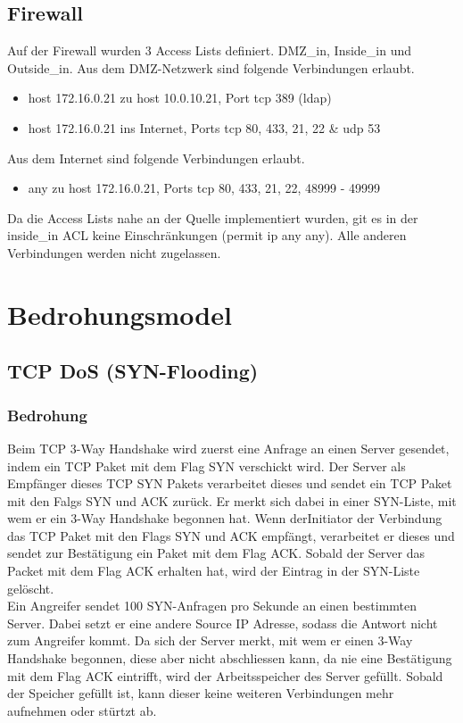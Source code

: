 \documentclass[11pt,a4paper,parskip=half]{scrartcl}
\begin{document}
\subsection{Firewall}
Auf der Firewall wurden 3 Access Lists definiert. DMZ\_in, Inside\_in und Outside\_in. Aus dem DMZ-Netzwerk  sind folgende Verbindungen erlaubt.
\begin{itemize}
	\item{host 172.16.0.21 zu host 10.0.10.21, Port tcp 389 (ldap)}
	\item{host 172.16.0.21 ins Internet, Ports tcp 80, 433, 21, 22 \& udp 53}
\end{itemize}
Aus dem Internet sind folgende Verbindungen erlaubt.
\begin{itemize}
	\item{any zu host 172.16.0.21, Ports tcp 80, 433, 21, 22, 48999 - 49999}
\end{itemize}
Da die Access Lists nahe an der Quelle implementiert wurden, git es in der inside\_in ACL keine Einschränkungen (permit ip any any). Alle anderen Verbindungen werden nicht zugelassen.


\section{Bedrohungsmodel}
\subsection{TCP DoS (SYN-Flooding)}
\subsubsection{Bedrohung}
Beim TCP 3-Way Handshake wird zuerst eine Anfrage an einen Server gesendet, indem ein TCP Paket mit dem Flag SYN verschickt wird. Der Server als Empfänger dieses TCP SYN Pakets verarbeitet dieses und sendet ein TCP Paket mit den Falgs SYN und ACK zurück. Er merkt sich dabei in einer SYN-Liste, mit wem er ein 3-Way Handshake begonnen hat. Wenn derInitiator der Verbindung das TCP Paket mit den Flags SYN und ACK empfängt, verarbeitet er dieses und sendet zur Bestätigung ein Paket mit dem Flag ACK. Sobald der Server das Packet mit dem Flag ACK erhalten hat, wird der Eintrag in der SYN-Liste gelöscht.\\
Ein Angreifer sendet 100 SYN-Anfragen pro Sekunde an einen bestimmten Server. Dabei setzt er eine andere Source IP Adresse, sodass die Antwort nicht zum Angreifer kommt. Da sich der Server merkt, mit wem er einen 3-Way Handshake begonnen, diese aber nicht abschliessen kann, da nie eine Bestätigung mit dem Flag ACK eintrifft, wird der Arbeitsspeicher des Server gefüllt. Sobald der Speicher gefüllt ist, kann dieser keine weiteren Verbindungen mehr aufnehmen oder stürtzt ab.
\end{document}
